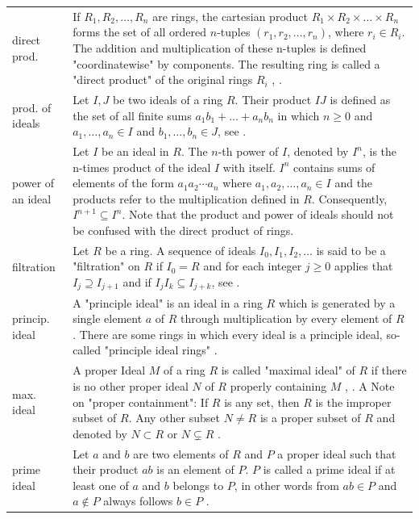 \documentclass[12pt]{amsart}
\theoremstyle{definition}
\begin{document}
{\renewcommand{\arraystretch}{1.8}
\begin{table}[H]
	\centering
	\begin{tabular}{|P{1.4cm} p{13.4cm}|}
		\hline
		direct prod. & If $R_1,R_2,\ldots,R_n$ are rings, the cartesian product $R_1\times R_2\times\ldots\times R_n$ forms the set of all ordered $n$-tuples $(r_1,r_2,\ldots,r_n)$, where $r_i\in R_i$. The addition and multiplication of these n-tuples is defined "coordinatewise" by components. The resulting ring is called a "direct product" of the original rings $R_i$ \cite[p.~51]{Ref_Wolfart_2011}, \cite[p.~169]{Ref_Fraleigh_2014}.
		\\
		prod. of ideals & Let $I,J$ be two ideals of a ring $R$. Their product $IJ$ is defined as the set of all finite sums $a_1b_1+\ldots+a_nb_n$ in which $n\ge0$ and $a_1,\ldots,a_n\in I$ and $b_1,\ldots,b_n\in J$, see \cite[p.~87]{Ref_Schmidt_2007}.
		\\
		power of an ideal & Let $I$ be an ideal in $R$. The $n$-th power of $I$, denoted by $I^n$, is the n-times product of the ideal $I$ with itself. $I^n$ contains sums of elements of the form $a_1a_2\cdots a_n$ where $a_1,a_2,\ldots,a_n\in I$ and the products refer to the multiplication defined in $R$. Consequently, $I^{n+1}\subseteq I^n$. Note that the product and power of ideals should not be confused with the direct product of rings.
		\\
		filtration & Let $R$ be a ring. A sequence of ideals $I_0,I_1,I_2,\ldots$ is said to be a "filtration" on $R$ if $I_0=R$ and for each integer $j\ge0$ applies that $I_j\supseteq I_{j+1}$ and if $I_jI_k\subseteq I_{j+k}$, see \cite[p.~269]{Ref_Lucas_2001}.
		\\
		princip. ideal & A "principle ideal" is an ideal in a ring $R$ which is generated by a single element $a$ of $R$ through multiplication by every element of $R$. There are some rings in which every ideal is a principle ideal, so-called "principle ideal rings" \cite[p.~68]{Ref_Wolfart_2011}.
		\\
		max. ideal & A proper Ideal $M$ of a ring $R$ is called "maximal ideal" of $R$  if there is no other proper ideal $N$ of $R$ properly containing $M$ \cite[p.~247]{Ref_Fraleigh_2014}, \cite[p.~37]{Ref_Northcott_1953}. A Note on "proper containment": If $R$ is any set, then $R$ is the improper subset of $R$. Any other subset $N\ne R$ is a proper subset of $R$ and denoted by $N\subset R$ or $N\varsubsetneq R$ \cite[p.~2]{Ref_Fraleigh_2014}.
		\\
		prime ideal & Let $a$ and $b$ are two elements of $R$ and $P$ a proper ideal such that their product $ab$ is an element of $P$. $P$ is called a prime ideal if at least one of $a$ and $b$ belongs to $P$, in other words from $ab\in P$ and $a\notin P$ always follows $b\in P$ \cite[p.~9]{Ref_Northcott_1953}.

\end{tabular}
\end{table}}
\end{document}
